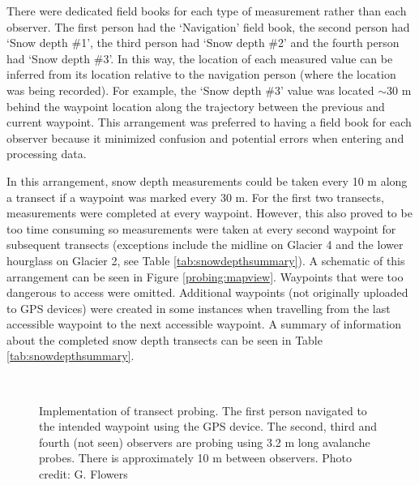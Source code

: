 \documentclass{sfuthesis}
\begin{document}
There were dedicated field books for each type of measurement rather than each observer. The first person had the `Navigation' field book, the second person had `Snow depth \#1', the third person had `Snow depth \#2' and the fourth person had `Snow depth \#3'. In this way, the location of each measured value can be inferred from its location relative to the navigation person (where the location was being recorded). For example, the `Snow depth \#3' value was located $\sim$30 m behind the waypoint location along the trajectory between the previous and current waypoint. This arrangement was preferred to having a field book for each observer because it minimized confusion and potential errors when entering and processing data.

In this arrangement, snow depth measurements could be taken every 10 m along a transect if a waypoint was marked every 30 m. For the first two transects, measurements were completed at every waypoint. However, this also proved to be too time consuming so measurements were taken at every second waypoint for subsequent transects (exceptions include the midline on Glacier 4 and the lower hourglass on Glacier 2, see Table \ref{tab:snowdepthsummary}). A schematic of this arrangement can be seen in Figure \ref{probing:mapview}. Waypoints that were too dangerous to access were omitted. Additional waypoints (not originally uploaded to GPS devices) were created in some instances when travelling from the last accessible waypoint to the next accessible waypoint. A summary of information about the completed snow depth transects can be seen in Table \ref{tab:snowdepthsummary}.

\begin{figure}
	\centering
	\\
	\caption{Implementation of transect probing. The first person navigated to the intended waypoint using the GPS device. The second, third and fourth (not seen) observers are probing using 3.2 m long avalanche probes. There is approximately 10 m between observers. Photo credit: G. Flowers}
	\label{photo_probing}
	\end{figure}
\end{document}
